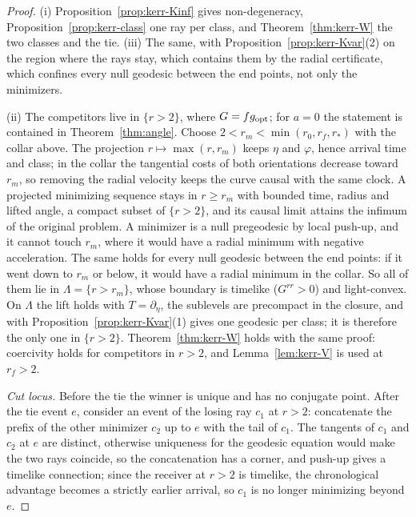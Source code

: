 \documentclass[aip,jmp,amsmath,amssymb,reprint]{revtex4-2}
\newcommand{\gopt}{g_{\rm opt}}
\theoremstyle{plain}
\theoremstyle{definition}
\begin{document}
\begin{proof}
(i) Proposition~\ref{prop:kerr-Kinf} gives non-degeneracy, Proposition~\ref{prop:kerr-class} one ray per
class, and Theorem~\ref{thm:kerr-W} the two classes and the tie. (iii) The same, with
Proposition~\ref{prop:kerr-Kvar}(2) on the region where the rays stay, which contains them by the
radial certificate, which confines every null geodesic between the end points, not only the
minimizers.

(ii) The competitors live in $\{r>2\}$, where $G=f\gopt$; for $a=0$ the statement is contained in
Theorem~\ref{thm:angle}. Choose $2<r_m<\min(r_0,r_f,r_*)$ with the collar above. The projection
$r\mapsto\max(r,r_m)$ keeps $\eta$ and $\varphi$, hence arrival time and class; in the collar the tangential
costs of both orientations decrease toward $r_m$, so removing the radial velocity keeps the
curve causal with the same clock. A projected minimizing sequence stays in $r\ge r_m$ with bounded
time, radius and lifted angle, a compact subset of $\{r>2\}$, and its causal limit attains the
infimum of the original problem. A minimizer is a null pregeodesic by local push-up, and it
cannot touch $r_m$, where it would have a radial minimum with negative acceleration. The same
holds for every null geodesic between the end points: if it went down to $r_m$ or below, it
would have a radial minimum in the collar. So all of them lie in $\Lambda=\{r>r_m\}$, whose boundary is
timelike ($G^{rr}>0$) and light-convex. On $\Lambda$ the lift holds with $T=\partial_\eta$, the sublevels are
precompact in the closure, and~\cite[Theorem~1.7]{GiannoniMasielloPiccioneMorse} with
Proposition~\ref{prop:kerr-Kvar}(1) gives one geodesic per class; it is therefore the only one in
$\{r>2\}$. Theorem~\ref{thm:kerr-W} holds with the same proof: coercivity holds for competitors in
$r>2$, and Lemma~\ref{lem:kerr-V} is used at $r_f>2$.

\emph{Cut locus.} Before the tie the winner is unique and has no conjugate point. After the tie
event $e$, consider an event of the losing ray $c_1$ at $r>2$: concatenate the prefix of the other
minimizer $c_2$ up to $e$ with the tail of $c_1$. The tangents of $c_1$ and $c_2$ at $e$ are distinct,
otherwise uniqueness for the geodesic equation would make the two rays coincide, so the
concatenation has a corner, and push-up gives a timelike connection; since the receiver at $r>2$ is
timelike, the chronological advantage becomes a strictly earlier arrival, so $c_1$ is no longer
minimizing beyond $e$.
\end{proof}
\end{document}
